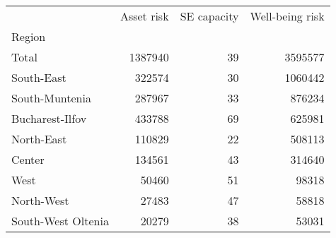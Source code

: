 \begin{tabular}{lrrr}
\toprule
{} &  Asset risk &  SE capacity &  Well-being risk \\
Region             &             &              &                  \\
\midrule
Total              &     1387940 &           39 &          3595577 \\
South-East         &      322574 &           30 &          1060442 \\
South-Muntenia     &      287967 &           33 &           876234 \\
Bucharest-Ilfov    &      433788 &           69 &           625981 \\
North-East         &      110829 &           22 &           508113 \\
Center             &      134561 &           43 &           314640 \\
West               &       50460 &           51 &            98318 \\
North-West         &       27483 &           47 &            58818 \\
South-West Oltenia &       20279 &           38 &            53031 \\
\bottomrule
\end{tabular}
